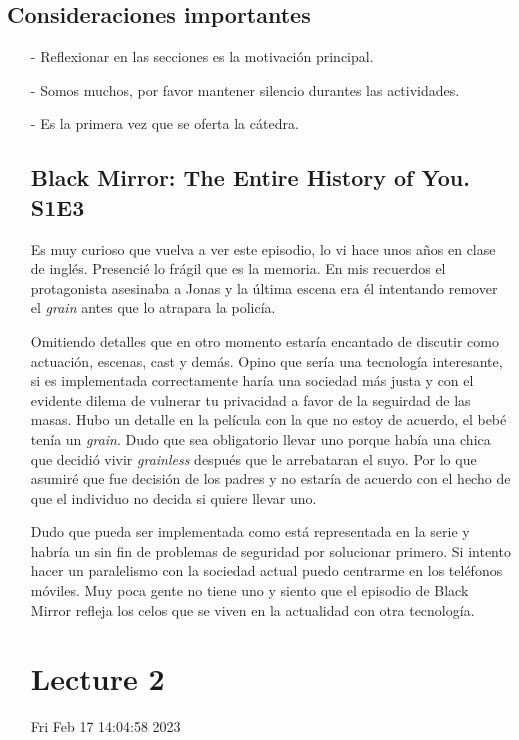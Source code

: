 \documentclass{article}
\theoremstyle{definition}
\begin{document}
\subsection{Consideraciones importantes}

\begin{itemize}

  \item[-] Reflexionar en las secciones es la motivación principal.
  \item[-] Somos muchos, por favor mantener silencio durantes las 
    actividades.
  \item[-] Es la primera vez que se oferta la cátedra.

\subsection{Black Mirror: The Entire History of You. S1E3}
\begin{flushleft}
Es muy curioso que vuelva a ver este episodio, lo vi hace unos años
en clase de inglés. Presencié lo frágil que es la memoria. En mis 
recuerdos el protagonista asesinaba a Jonas y la última escena era 
él intentando remover el \textit{grain} antes que lo atrapara la 
policía.

Omitiendo detalles que en otro momento estaría encantado de discutir
como actuación, escenas, cast y demás. Opino que sería una tecnología
interesante, si es implementada correctamente haría una sociedad más 
justa y con el evidente dilema de vulnerar tu privacidad a favor de 
la seguirdad de las masas. Hubo un detalle en la película con la que 
no estoy de acuerdo, el bebé tenía un \textit{grain}. Dudo que sea 
obligatorio llevar uno porque había una chica que decidió vivir
\textit{grainless} después que le arrebataran el suyo. Por lo que 
asumiré que fue decisión de los padres y no estaría de acuerdo con 
el hecho de que el individuo no decida si quiere llevar uno.

Dudo que pueda ser implementada como está representada 
en la serie y habría un sin fin de problemas de seguridad por 
solucionar primero. Si intento hacer un paralelismo con la sociedad 
actual puedo centrarme en los teléfonos móviles. Muy poca gente no 
tiene uno y siento que el episodio de Black Mirror refleja los 
celos que se viven en la actualidad con otra tecnología.

\section{Lecture 2}
Fri Feb 17 14:04:58 2023


\end{flushleft}
\end{itemize}
\end{document}

